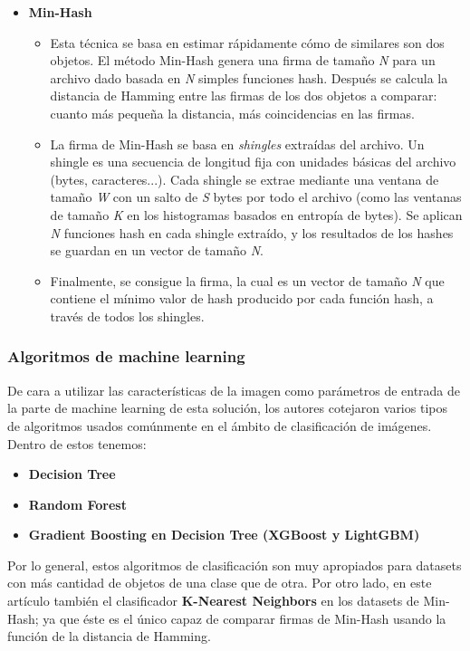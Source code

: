 \begin{itemize}
\begin{itemize}
\end{itemize}
\item \textbf{Min-Hash}
\begin{itemize}
\item Esta técnica se basa en estimar rápidamente cómo de similares son dos objetos. El método Min-Hash genera una firma de tamaño \textit{N} para un archivo dado basada en \textit{N} simples funciones hash. Después se calcula la distancia de Hamming entre las firmas de los dos objetos a comparar: cuanto más pequeña la distancia, más coincidencias en las firmas. %
\item La firma de Min-Hash se basa en \textit{shingles} extraídas del archivo. Un shingle es una secuencia de longitud fija con unidades básicas del archivo (bytes, caracteres...). Cada shingle se extrae mediante una ventana de tamaño \textit{W} con un salto de \textit{S} bytes por todo el archivo (como las ventanas de tamaño \textit{K} en los histogramas basados en entropía de bytes). Se aplican \textit{N} funciones hash en cada shingle extraído, y los resultados de los hashes se guardan en un vector de tamaño \textit{N}.
\item Finalmente, se consigue la firma, la cual es un vector de tamaño \textit{N} que contiene el mínimo valor de hash producido por cada función hash, a través de todos los shingles.
\end{itemize}
\end{itemize}

\subsubsection{Algoritmos de machine learning}

De cara a utilizar las características de la imagen como parámetros de entrada de la parte de machine learning de esta solución, los autores cotejaron varios tipos de algoritmos usados comúnmente en el ámbito de clasificación de imágenes. Dentro de estos tenemos:

\begin{itemize}
\item \textbf{Decision Tree}
\item \textbf{Random Forest}
\item \textbf{Gradient Boosting en Decision Tree (XGBoost y LightGBM)}
\end{itemize}

Por lo general, estos algoritmos de clasificación son muy apropiados para datasets con más cantidad de objetos de una clase que de otra. Por otro lado, en este artículo también el clasificador \textbf{K-Nearest Neighbors} en los datasets de Min-Hash; ya que éste es el único capaz de comparar firmas de Min-Hash usando la función de la distancia de Hamming.

